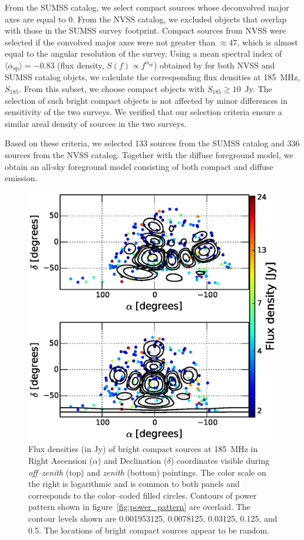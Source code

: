 \documentclass[preprint2,iop,numberedappendix]{emulateapj}
\begin{document}
From the SUMSS catalog, we select compact sources whose deconvolved major axes are equal to 0\arcsec. From the NVSS catalog, we excluded objects that overlap with those in the SUMSS survey footprint. Compact sources from NVSS were selected if the convolved major axes were not greater than $\approx 47$\arcsec, which is almost equal to the angular resolution of the survey. Using a mean spectral index of $\langle\alpha_\textrm{sp}\rangle=-0.83$ (flux density, $S(f)\propto f^{\alpha_\textrm{sp}}$) obtained by \citet{mau03} for both NVSS and SUMSS catalog objcts, we calculate the corresponding flux densities at 185~MHz, $S_{185}$. From this subset, we choose compact objects with $S_{185}\geq 10$~Jy. The selection of such bright compact objects is not affected by minor differences in sensitivity of the two surveys. We verified that our selection criteria ensure a similar areal density of sources in the two surveys. 

Based on these criteria, we selected 133 sources from the SUMSS catalog and 336 sources from the NVSS catalog. Together with the diffuse foreground model, we obtain an all-sky foreground model consisting of both compact and diffuse emission.

\begin{figure}[htb]
\centering
\includegraphics[width=\linewidth]{figures/v1_0/csm.eps}
\caption{Flux densities (in Jy) of bright compact sources at 185~MHz in Right Ascension ($\alpha$) and Declination ($\delta$) coordinates visible during {\it off--zenith} (top) and {\it zenith} (bottom) pointings. The color scale on the right is logarithmic and is common to both panels and corresponds to the color--coded filled circles. Contours of power pattern shown in figure~\ref{fig:power_pattern} are overlaid. The contour levels shown are 0.001953125, 0.0078125, 0.03125, 0.125, and 0.5. The locations of bright compact sources appear to be random.\label{fig:CSM}}
\end{figure}
\end{document}

